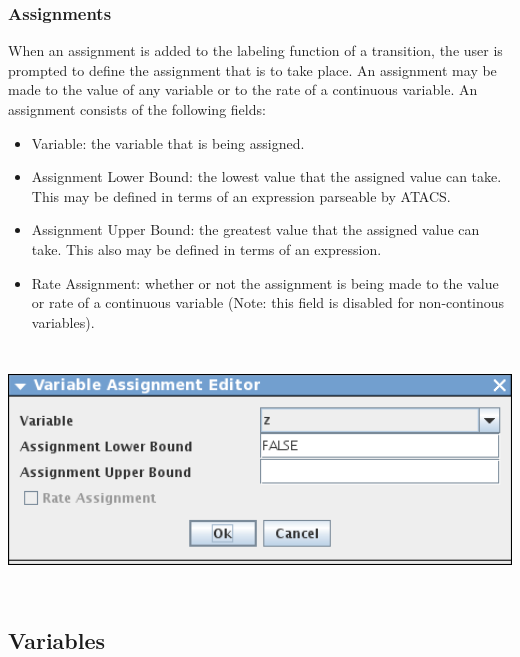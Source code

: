 \documentclass[titlepage,11pt]{article}
\begin{document}
\subsubsection{\label{assignments}Assignments}
\noindent
When an assignment is added to the labeling function of a transition, the user
is prompted to define the assignment that is to take place.  An assignment may
be made to the value of any variable or to the rate of a continuous variable.
An assignment consists of the following fields:
\begin{itemize}
\item Variable: the variable that is being assigned.
\item Assignment Lower Bound: the lowest value that the assigned value can take.
       This may be defined in terms of an expression parseable by ATACS.
\item Assignment Upper Bound: the greatest value that the assigned value can 
       take.  This also may be defined in terms of an expression.
\item Rate Assignment: whether or not the assignment is being made to the value
       or rate of a continuous variable (Note: this field is disabled for
       non-continous variables).
\end{itemize}
\begin{center}
\includegraphics[height=65mm]{screenshots/assignment}
\end{center}

\subsection{\label{variables}Variables}
\end{document}

